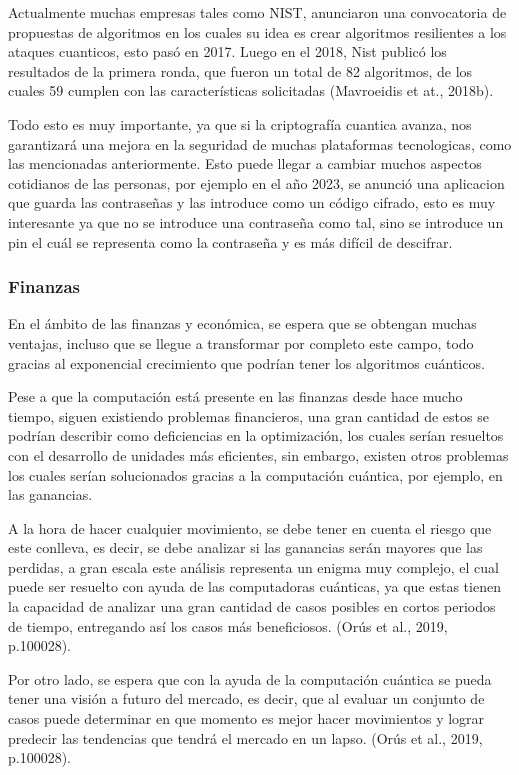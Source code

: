 \documentclass{article}
\begin{document}
Actualmente muchas empresas tales como NIST, anunciaron una convocatoria de propuestas de algoritmos en los cuales su idea es crear algoritmos resilientes a los ataques cuanticos, esto pasó en 2017. Luego en el 2018, Nist publicó los resultados de la primera ronda, que fueron un total de 82 algoritmos, de los cuales 59 cumplen con las características solicitadas (Mavroeidis et at., 2018b).

Todo esto es muy importante, ya que si la criptografía cuantica avanza, nos garantizará una mejora en la seguridad de muchas plataformas tecnologicas, como las mencionadas anteriormente. Esto puede llegar a cambiar muchos aspectos cotidianos de las personas, por ejemplo en el año 2023, se anunció una aplicacion que guarda las contraseñas y las introduce como un código cifrado, esto es muy interesante ya que no se introduce una contraseña como tal, sino se introduce un pin el cuál se representa como la contraseña y es más difícil de descifrar.

 \subsubsection{Finanzas} 
 En el ámbito de las finanzas y económica, se espera que se obtengan muchas ventajas, incluso que se llegue a transformar por completo este campo, todo gracias al exponencial crecimiento que podrían tener los algoritmos cuánticos.
 
Pese a que la computación está presente en las finanzas desde hace mucho tiempo, siguen existiendo problemas financieros, una gran cantidad de estos se podrían describir como deficiencias en la optimización, los cuales serían resueltos con el desarrollo de unidades más eficientes, sin embargo, existen otros problemas los cuales serían solucionados gracias a la computación cuántica, por ejemplo, en las ganancias. 

A la hora de hacer cualquier movimiento, se debe tener en cuenta el riesgo que este conlleva, es decir, se debe analizar si las ganancias serán mayores que las perdidas, a gran escala este análisis representa un enigma muy complejo, el cual puede ser resuelto con ayuda de las computadoras cuánticas, ya que estas tienen la capacidad de analizar una gran cantidad de casos posibles en cortos periodos de tiempo, entregando así los casos más beneficiosos. (Orús et al., 2019, p.100028).

Por otro lado, se espera que con la ayuda de la computación cuántica se pueda tener una visión a futuro del mercado, es decir, que al evaluar un conjunto de casos puede determinar en que momento es mejor hacer movimientos y lograr predecir las tendencias que tendrá el mercado en un lapso. (Orús et al., 2019, p.100028).
\end{document}
